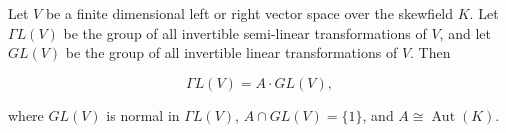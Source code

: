 Let $V$ be a finite dimensional left or right vector space over the skewfield $K$. Let $\Gamma L(V)$ be the group of all invertible semi-linear transformations of $V$, and let $GL(V)$ be the group of all invertible linear transformations of $V$. Then

$$\Gamma L(V) = A \cdot GL(V),$$

where $GL(V)$ is normal in $\Gamma L(V)$, $A \cap GL(V) = \{1\}$, and $A \cong \operatorname{Aut}(K)$.

